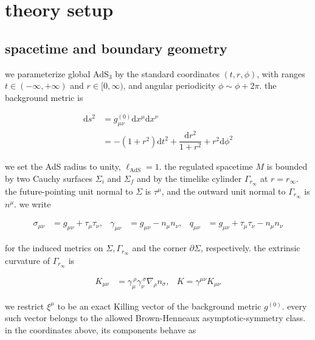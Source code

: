\section{theory setup}\label{sec:theory-setup}

\subsection{spacetime and boundary geometry}\label{subsec:spacetime-boundary-geometry}

we parameterize global AdS$\displaystyle{_{3}}$ by the standard coordinates $\displaystyle{(t,r,\phi)}$, with ranges $\displaystyle{t\in(-\infty,+\infty)}$ and $\displaystyle{r\in[0,\infty)}$, and angular periodicity $\displaystyle{\phi \sim \phi+2\pi}$. the background metric is

\begin{align}
\mathrm{d}s^{2} & =g^{(0)}_{\mu \nu}\mathrm{d}x^{\mu}\mathrm{d}x^{\nu} \\
 & =-(1+r^{2})\mathrm{d}t^{2}+\dfrac{\mathrm{d}r^{2}}{1+r^{2}}+r^{2}\mathrm{d}\phi ^{2}
\end{align}

we set the AdS radius to unity, $\displaystyle{\ell_{\text{AdS}}=1}$. the regulated spacetime $\displaystyle{M}$ is bounded by two Cauchy surfaces $\displaystyle{\Sigma_{i}}$ and $\displaystyle{\Sigma _{f}}$ and by the timelike cylinder $\displaystyle{\Gamma _{r_{\infty}}}$ at $\displaystyle{r=r_{\infty}}$. the future-pointing unit normal to $\displaystyle{\Sigma}$ is $\displaystyle{\tau ^{\mu}}$, and the outward unit normal to $\displaystyle{\Gamma _{r_{\infty}}}$ is $\displaystyle{n^{\mu}}$. we write

\begin{align}
\sigma _{\mu \nu} & =g_{\mu \nu}+\tau _{\mu}\tau _{\nu}, & \gamma _{\mu \nu} & =g_{\mu \nu}-n_{\mu}n_{\nu}, & q_{\mu \nu} & =g_{\mu \nu}+\tau _{\mu}\tau _{\nu}-n_{\mu}n_{\nu}
\end{align}

for the induced metrics on $\displaystyle{\Sigma,\Gamma _{r_{\infty}}}$ and the corner $\displaystyle{\partial \Sigma}$, respectively. the extrinsic curvature of $\displaystyle{\Gamma _{r_{\infty}}}$ is

\begin{align}
K_{\mu \nu} & =\gamma _{\mu}^{~\rho}\gamma _{\nu}^{~\sigma}\nabla _{\rho}n_{\sigma}, & K=\gamma ^{\mu \nu}K_{\mu \nu}
\end{align}

we restrict $\xi ^{\mu}$ to be an exact Killing vector of the background metric $\displaystyle{g^{(0)}}$. every such vector belongs to the allowed Brown-Henneaux asymptotic-symmetry class. in the coordinates above, its components behave as

